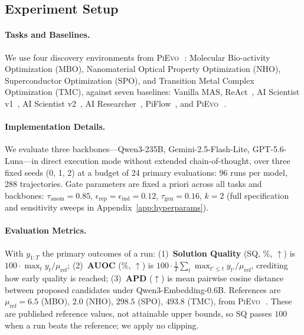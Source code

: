 \documentclass{article}
\newcommand{\pievo}{\textsc{PiEvo}\,}
\begin{document}
\subsection{Experiment Setup}
\label{sec:matched}

\paragraph{Tasks and Baselines.} We use four discovery environments from \pievo{}~\citep{pu2026pievo}: Molecular Bio-activity Optimization (MBO), Nanomaterial Optical Property Optimization (NHO), Superconductor Optimization (SPO), and Transition Metal Complex Optimization (TMC), against seven baselines: Vanilla MAS, ReAct~\citep{yao2023reactsynergizingreasoningacting}, AI Scientist v1~\citep{lu2024aiscientist}, AI Scientist v2~\citep{yamada2025aiscientistv2workshoplevelautomated}, AI Researcher~\citep{tang2025airesearcherautonomousscientificinnovation}, PiFlow~\citep{pu2026piflowprincipleawarescientificdiscovery}, and \pievo{}~\citep{pu2026pievo}.

\paragraph{Implementation Details.} We evaluate three backbones---Qwen3-235B, Gemini-2.5-Flash-Lite, GPT-5.6-Luna---in direct execution mode without extended chain-of-thought, over three fixed seeds (0, 1, 2) at a budget of 24 primary evaluations: 96 runs per model, 288 trajectories. Gate parameters are fixed a priori across all tasks and backbones: $\tau_{\mathrm{anom}}=0.85$, $\epsilon_{\mathrm{rep}}=\epsilon_{\mathrm{ind}}=0.12$, $\tau_{\mathrm{gen}}=0.16$, $k=2$ (full specification and sensitivity sweeps in Appendix~\ref{app:hyperparams}). 

\paragraph{Evaluation Metrics.} With $y_{1:T}$ the primary outcomes of a run: (1)~\textbf{Solution Quality} (SQ, \%, $\uparrow$) is $100\cdot\max_t y_t/\mu_{\mathrm{ref}}$; (2)~\textbf{AUOC} (\%, $\uparrow$) is $100\cdot\frac{1}{T}\sum_{t}\max_{t'\leq t} y_{t'}/\mu_{\mathrm{ref}}$, crediting how early quality is reached; (3)~\textbf{APD} ($\uparrow$) is mean pairwise cosine distance between proposed candidates under Qwen3-Embedding-0.6B. References are $\mu_{\mathrm{ref}}=6.5$ (MBO), $2.0$ (NHO), $298.5$ (SPO), $493.8$ (TMC), from \pievo{}~\citep{pu2026pievo}. These are published reference values, not attainable upper bounds, so SQ passes $100$ when a run beats the reference; we apply no clipping.
\end{document}
